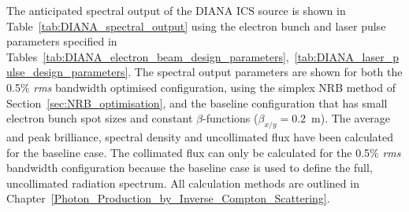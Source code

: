 \documentclass[../main.tex]{subfiles}
\begin{document}
The anticipated spectral output of the DIANA ICS source is shown in Table~\ref{tab:DIANA_spectral_output} using the electron bunch and laser pulse parameters specified in Tables~\ref{tab:DIANA_electron_beam_design_parameters},~\ref{tab:DIANA_laser_pulse_design_parameters}. The spectral output parameters are shown for both the 0.5\% \textit{rms} bandwidth optimised configuration, using the simplex NRB method of Section~\ref{sec:NRB_optimisation}, and the baseline configuration that has small electron bunch spot sizes and constant $\beta$-functions ($\beta_{x/y}=0.2$~\si{\meter}). The average and peak brilliance, spectral density and uncollimated flux have been calculated for the baseline case. The collimated flux can only be calculated for the 0.5\% \textit{rms} bandwidth configuration because the baseline case is used to define the full, uncollimated radiation spectrum. All calculation methods are outlined in Chapter~\ref{Photon_Production_by_Inverse_Compton_Scattering}. 
\end{document}
